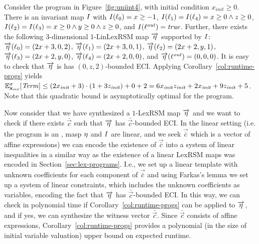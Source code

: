 \begin{example}
Consider the program in Figure~\ref{fig:uniint4}, with initial condition 
$x_{\mathit{init}}\geq 0$. There is an 
invariant map $I$ with $I(\ell_0)=x\geq -1$, $I(\ell_1)=I(\ell_4) = 
x\geq 0 
\wedge z\geq 0$, $I(\ell_2)=I(\ell_3)= x\geq 0 \wedge y \geq 0
\wedge z\geq 0$, and $I(\ell^{\mathit{out}})=\mathit{true}$. Further, there exists 
the following 
$3$-dimensional 
$1$-LinLexRSM map $\overrightarrow{\eta}$ supported by $I$: 
$\overrightarrow{\eta}(\ell_0)=(2x+3,0,2)$, 
$\overrightarrow{\eta}(\ell_1)=(2x+3,0,1)$, 
$\overrightarrow{\eta}(\ell_2)=(2x+2,y,1)$, 
$\overrightarrow{\eta}(\ell_3)=(2x+2,y,0)$, 
$\overrightarrow{\eta}(\ell_4)=(2x+2,0,0)$, and 
$\overrightarrow{\eta}(\ell^{\mathit{out}})=(0,0,0)$. It is 
easy to check that $\overrightarrow{\eta}$ is has $(0,z,2)$-bounded ECI. 
Applying 
Corollary~\ref{col:runtime-progs} yields $\mathbb{E}^{\sigma}_{\mathbf{x}_{\mathit{init}}}[\mathit{Term}]\leq 
(2x_{\mathit{init}} + 
3)\cdot(1+3z_{\mathit{init}})+0+2= 6x_{\mathit{init}}z_{\mathit{init}} + 
2x_{\mathit{init}} + 9z_{\mathit{init}}+5$. Note that this quadratic bound is 
asymptotically optimal for the program.
\end{example}

\begin{remark}\label{rem:poly}
Now consider that we have synthesized a $1$-LexRSM map $\overrightarrow{\eta}$ 
and we want 
to check if there exists $\bar{\vec{c}}$ such that $\overrightarrow{\eta}$ has 
$\bar{\vec{c}}$-bounded ECI. In the linear setting (i.e. the program is an 
\APP{}, masp $\eta$ and $I$ are linear, and we seek $\vec{\bar{c}}$ which is 
a vector of affine expressions) we can encode the existence of $\vec{\bar{c}}$ 
into a system of linear inequalities in a similar way as the existence of a 
linear LexRSM maps was encoded in Section~\ref{sec:lex-programs}. I.e., we 
set up a linear template with unknown coefficients for each component of 
$\vec{\bar{c}}$ and using Farkas's lemma we set up a system of linear 
constraints, which includes the unknown coefficients as variables, encoding the 
fact that $\overrightarrow{\eta}$ has $\bar{\vec{c}}$-bounded ECI. In this way, 
we can check in polynomial time if 
Corollary~\ref{col:runtime-progs} can be applied to $\overrightarrow{\eta}$, 
and if yes, 
we can synthesize the witness vector $\bar{\vec{c}}$. Since $\bar{\vec{c}}$ 
consists of affine expressions, Corollary~\ref{col:runtime-progs} provides a 
polynomial (in the size of 
initial variable valuation) upper bound on expected runtime.
\end{remark}


